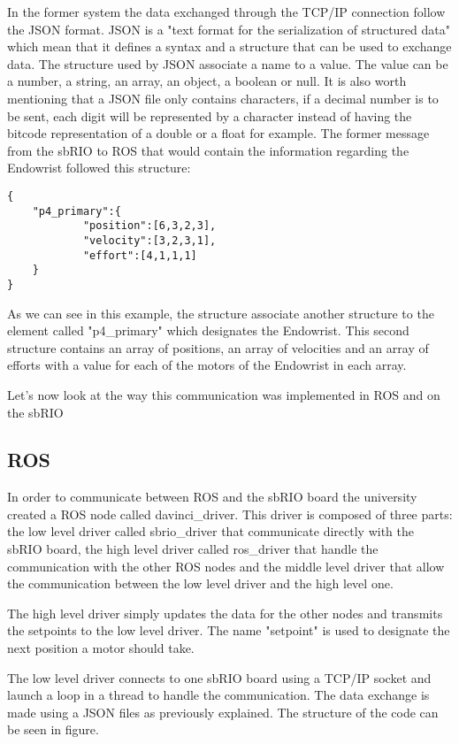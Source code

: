 In the former system the data exchanged through the TCP/IP connection follow the \gls{JSON} format. \gls{JSON} is a "text format for the serialization of structured data"\cite{JSON_IETF} which mean that it defines a syntax and a structure that can be used to exchange data. The structure used by \gls{JSON} associate a name to a value. The value can be a number, a string, an array, an object, a boolean or null. It is also worth mentioning that a \gls{JSON} file only contains characters, if a decimal number is to be sent, each digit will be represented by a character instead of having the bitcode representation of a double or a float for example. The former message from the sbRIO to ROS that would contain the information regarding the Endowrist followed this structure:

\begin{lstlisting}
{
	"p4_primary":{
			"position":[6,3,2,3],
			"velocity":[3,2,3,1],
			"effort":[4,1,1,1]
	}
}
\end{lstlisting}

As we can see in this example, the structure associate another structure to the element called "p4\_primary" which designates the Endowrist. This second structure contains an array of positions, an array of velocities and an array of efforts with a value for each of the motors of the Endowrist in each array.

Let's now look at the way this communication was implemented in ROS and on the sbRIO

\subsection{ROS}

In order to communicate between ROS and the sbRIO board the university created a ROS node called davinci\_driver. This driver is composed of three parts: the low level driver called sbrio\_driver that communicate directly with the sbRIO board, the high level driver called ros\_driver that handle the communication with the other ROS nodes and the middle level driver that allow the communication between the low level driver and the high level one.


The high level driver simply updates the data for the other nodes and transmits the setpoints to the low level driver. The name "setpoint" is used to designate the next position a motor should take.

The low level driver connects to one sbRIO board using a TCP/IP socket and launch a loop in a thread to handle the communication. The data exchange is made using a \gls{JSON} files as previously explained. The structure of the code can be seen in figure.

